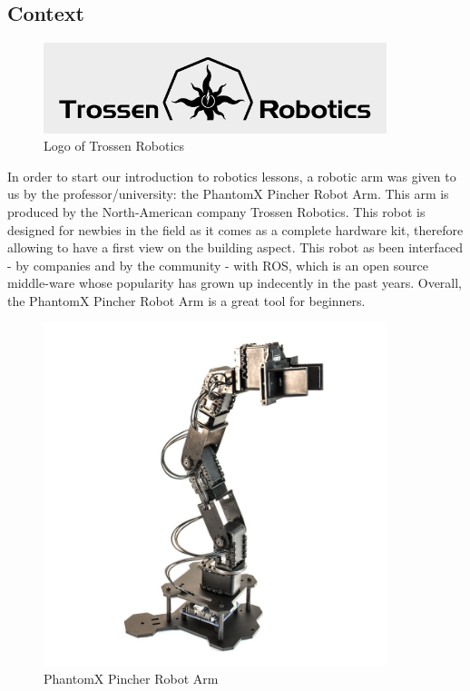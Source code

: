 \documentclass[aps,letterpaper,11pt]{revtex4}
\begin{document}
\subsection{Context}

\begin{figure}[H]
	\centering
	\includegraphics[width=10cm]{Torssen.png}
	\caption{Logo of Trossen Robotics}
	\label{fig:TrossenLogo}    
\end{figure}

In order to start our introduction to robotics lessons, a robotic arm was given to us by the professor/university: the PhantomX Pincher Robot Arm.
This arm is produced by the North-American company Trossen Robotics. This robot is designed for newbies in the field as it comes as a complete hardware kit, therefore allowing to have a first view on the building aspect. This robot as been interfaced - by companies and by the community -  with ROS, which is an open source middle-ware whose popularity has grown up indecently in the past years. 
Overall, the PhantomX Pincher Robot Arm is a great tool for beginners.

\begin{figure}[H]
	\centering
	\includegraphics[width=10cm]{Robot.jpg}
	\caption{PhantomX Pincher Robot Arm}
	\label{fig:Robot_Trossen}    
\end{figure}
\end{document}
